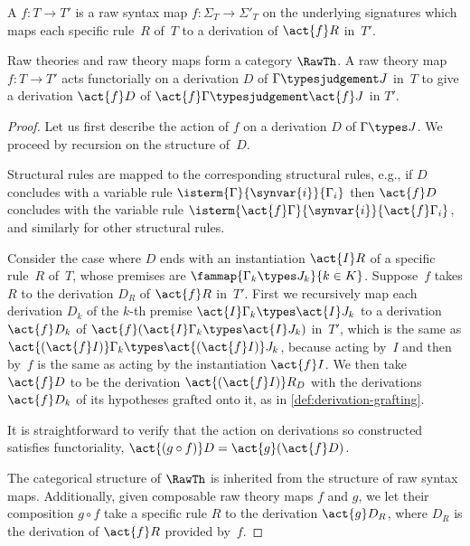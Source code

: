 \begin{definition}
  A  $f : T \to T'$ is a raw syntax map $f : \Sigma_T \to \Sigma'_T$ on the underlying signatures which maps each specific rule~$R$ of~$T$ to a derivation of $\act{f} R$ in~$T'$.
\end{definition}

\begin{proposition}
  Raw theories and raw theory maps form a category $\RawTh$.
  A raw theory map $f : T \to T'$ acts functorially on a derivation $D$ of $\Gamma \typesjudgement J$ in~$T$ to give a derivation $\act{f} D$ of $\act{f} \Gamma \typesjudgement \act{f} J$ in $T'$.
\end{proposition}


\begin{proof}
  Let us first describe the action of $f$ on a derivation $D$ of $\Gamma \types J$.
  We proceed by recursion on the structure of~$D$.

  Structural rules are mapped to the corresponding structural rules, e.g., if $D$ concludes with a variable rule $\isterm{\Gamma}{\synvar{i}}{\Gamma_i}$ then $\act{f} D$ concludes with the variable rule $\isterm{\act{f} \Gamma}{\synvar{i}}{\act{f} \Gamma_i}$, and similarly for other structural rules.

  Consider the case where $D$ ends with an instantiation $\act{I} R$ of a specific rule~$R$ of~$T$, whose premises are $\fammap{\Gamma_k \types J_k}{k \in K}$. Suppose~$f$ takes $R$ to the derivation $D_R$ of $\act{f} R$ in~$T'$.
  First we recursively map each derivation $D_k$ of the $k$-th premise $\act{I} \Gamma_k \types \act{I} J_k$ to a derivation $\act{f} D_k$ of $\act{f} (\act{I} \Gamma_k \types \act{I} J_k)$ in~$T'$, which is the same as $\act{(\act{f} I)} \Gamma_k \types \act{(\act{f} I)} J_k$, because acting by~$I$ and then by~$f$ is the same as acting by the instantiation $\act{f} I$.
  We then take $\act{f} D$ to be the derivation $\act{(\act{f} I)} R_D$ with the derivations $\act{f} D_k$ of its hypotheses grafted onto it, as in \cref{def:derivation-grafting}.

  It is straightforward to verify that the action on derivations so constructed satisfies functoriality, $\act{(g \circ f)} D = \act{g} (\act{f} D)$.

  The categorical structure of $\RawTh$ is inherited from the structure of raw syntax maps. Additionally, given composable raw theory maps $f$ and $g$, we let their composition $g \circ f$ take a specific rule $R$ to the derivation $\act{g} D_R$, where $D_R$ is the derivation of $\act{f} R$ provided by~$f$.
\end{proof}


